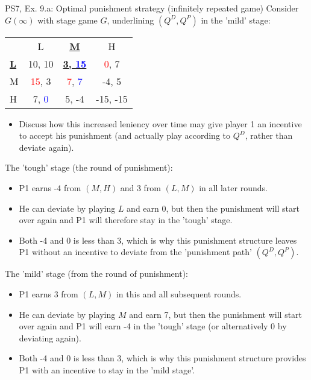 \begin{frame}{PS7, Ex. 9.a: Optimal punishment strategy (infinitely repeated game)}
    Consider $G(\infty)$ with stage game $G$, underlining $(Q^D,Q^P)$ in the 'mild' stage: \vspace{-6pt}
    \begin{table}
      \begin{tabular}{l|c|c|c|}
        \multicolumn{1}{c}{} & \multicolumn{1}{c}{L} & \multicolumn{1}{c}{\textbf{\underline{M}}} & \multicolumn{1}{c}{H} \\\cline{2-4}
        \textbf{\underline{L}} & 10, 10 & \textbf{\underline{3, \textcolor{blue}{15}}} & \textcolor{red}{0}, 7 \\\cline{2-4}
        M & \textcolor{red}{15}, 3 & \textcolor{red}{7}, \textcolor{blue}{7} & -4, 5 \\\cline{2-4}
        H & 7, \textcolor{blue}{0} & 5, -4 & -15, -15 \\\cline{2-4}
      \end{tabular}
    \end{table}
    \vspace{-6pt}
    \begin{itemize}
      \item[(a)] Discuss how this increased leniency over time may give player 1 an incentive to accept his punishment (and actually play according to $Q^D$, rather than deviate again).
    \end{itemize}
    \vspace{-8pt}
  \begin{multicols}{2}
    The 'tough' stage (the  round of punishment):\vspace{-6pt}
    \begin{itemize}
      \item P1 earns -4 from $(M, H)$ and 3 from $(L, M)$ in all later rounds.
      \item He can deviate by playing $L$ and earn 0, but then the punishment will start over again and P1 will therefore stay in the 'tough' stage.
      \item Both -4 and 0 is less than 3, which is why this punishment structure leaves P1 without an incentive to deviate from the 'punishment path' $(Q^D,Q^P)$.
    \end{itemize}
    \vfill\null\columnbreak
    The 'mild' stage (from the  round of punishment):\vspace{-6pt}
    \begin{itemize}
      \item P1 earns 3 from $(L, M)$ in this and all subsequent rounds.
      \item He can deviate by playing $M$ and earn 7, but then the punishment will start over again and P1 will earn -4 in the 'tough' stage (or alternatively 0 by deviating again).
      \item Both -4 and 0 is less than 3, which is why this punishment structure provides P1 with an incentive to stay in the 'mild stage'.
    \end{itemize}
    \vfill\null
  \end{multicols}
\end{frame}

